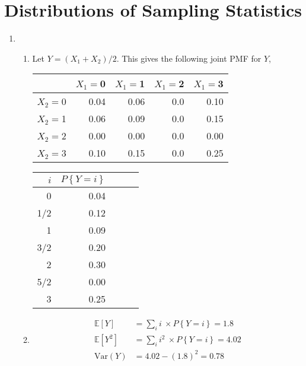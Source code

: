 \chapter{Distributions of Sampling Statistics}

\begin{enumerate}
	
	\item 
		\begin{enumerate}
			\item Let $ Y = (X_1 + X_2) / 2 $. This gives the following joint PMF for $ Y $,
			\begin{table}[H]
				\centering
				\begin{tabular}{@{}rrrrr@{}}
					\toprule
					&     $ X_1 =  $0 &     $ X_1 =  $1 &    $ X_1 =  $2 &     $ X_1 =  $3 \\
					\midrule
					$ X_2 =  $0 &  0.04 &  0.06 &  0.0 &  0.10 \\
					$ X_2 =  $1 &  0.06 &  0.09 &  0.0 &  0.15 \\
					$ X_2 =  $2 &  0.00 &  0.00 &  0.0 &  0.00 \\
					$ X_2 =  $3 &  0.10 &  0.15 &  0.0 &  0.25 \\
					\bottomrule
				\end{tabular}
			\end{table}
			
			\begin{table}[H]
				\centering
				\begin{tabular}{@{}rrrrr@{}}
					\toprule
					$ i $ &     $P\left\{Y = i\right\}$ \\
					\midrule
					0 &  0.04  \\
					1/2 &  0.12  \\
					1 &  0.09  \\
					3/2 &  0.20  \\
					2 & 0.30 \\
					5/2 & 0.00 \\
					3 & 0.25 \\
					\bottomrule
				\end{tabular}
			\end{table}
			
			\item \begin{align}
				\mathbb{E}[Y] &= \sum\limits_{i} i\ \times P\left\{Y = i\right\} = 1.8 \\
				\mathbb{E}[Y^2] &= \sum\limits_{i} i^2\ \times P\left\{Y = i\right\} = 4.02 \nonumber \\
				\mathrm{Var}(Y) &= 4.02 - (1.8)^2 = 0.78
			\end{align}
			

\end{enumerate}
\end{enumerate}
